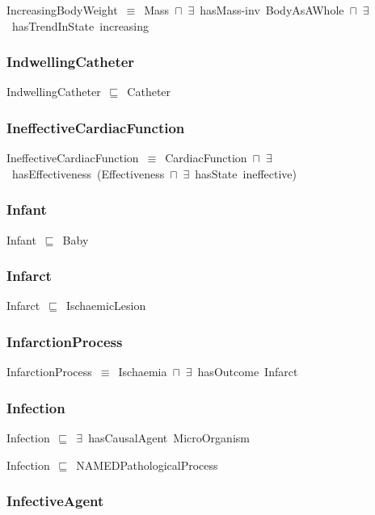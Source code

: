 \documentclass{article}
\begin{document}
IncreasingBodyWeight~\ensuremath{\equiv}~Mass~\ensuremath{\sqcap}~\ensuremath{\exists}~hasMass-inv~BodyAsAWhole~\ensuremath{\sqcap}~\ensuremath{\exists}~hasTrendInState~increasing

\subsubsection*{IndwellingCatheter}

IndwellingCatheter~\ensuremath{\sqsubseteq}~Catheter~

\subsubsection*{IneffectiveCardiacFunction}

IneffectiveCardiacFunction~\ensuremath{\equiv}~CardiacFunction~\ensuremath{\sqcap}~\ensuremath{\exists}~hasEffectiveness~(Effectiveness~\ensuremath{\sqcap}~\ensuremath{\exists}~hasState~ineffective)

\subsubsection*{Infant}

Infant~\ensuremath{\sqsubseteq}~Baby~

\subsubsection*{Infarct}

Infarct~\ensuremath{\sqsubseteq}~IschaemicLesion~

\subsubsection*{InfarctionProcess}

InfarctionProcess~\ensuremath{\equiv}~Ischaemia~\ensuremath{\sqcap}~\ensuremath{\exists}~hasOutcome~Infarct

\subsubsection*{Infection}

Infection~\ensuremath{\sqsubseteq}~\ensuremath{\exists}~hasCausalAgent~MicroOrganism~

Infection~\ensuremath{\sqsubseteq}~NAMEDPathologicalProcess~

\subsubsection*{InfectiveAgent}
\end{document}

